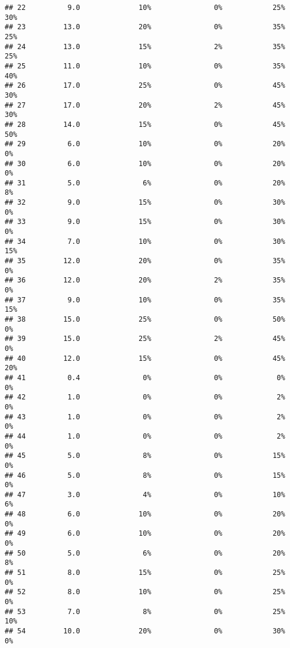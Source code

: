 \documentclass[
]{article}
\begin{document}
\begin{verbatim}
## 22          9.0              10%               0%            25%         30%
## 23         13.0              20%               0%            35%         25%
## 24         13.0              15%               2%            35%         25%
## 25         11.0              10%               0%            35%         40%
## 26         17.0              25%               0%            45%         30%
## 27         17.0              20%               2%            45%         30%
## 28         14.0              15%               0%            45%         50%
## 29          6.0              10%               0%            20%          0%
## 30          6.0              10%               0%            20%          0%
## 31          5.0               6%               0%            20%          8%
## 32          9.0              15%               0%            30%          0%
## 33          9.0              15%               0%            30%          0%
## 34          7.0              10%               0%            30%         15%
## 35         12.0              20%               0%            35%          0%
## 36         12.0              20%               2%            35%          0%
## 37          9.0              10%               0%            35%         15%
## 38         15.0              25%               0%            50%          0%
## 39         15.0              25%               2%            45%          0%
## 40         12.0              15%               0%            45%         20%
## 41          0.4               0%               0%             0%          0%
## 42          1.0               0%               0%             2%          0%
## 43          1.0               0%               0%             2%          0%
## 44          1.0               0%               0%             2%          0%
## 45          5.0               8%               0%            15%          0%
## 46          5.0               8%               0%            15%          0%
## 47          3.0               4%               0%            10%          6%
## 48          6.0              10%               0%            20%          0%
## 49          6.0              10%               0%            20%          0%
## 50          5.0               6%               0%            20%          8%
## 51          8.0              15%               0%            25%          0%
## 52          8.0              10%               0%            25%          0%
## 53          7.0               8%               0%            25%         10%
## 54         10.0              20%               0%            30%          0%

\end{verbatim}
\end{document}
